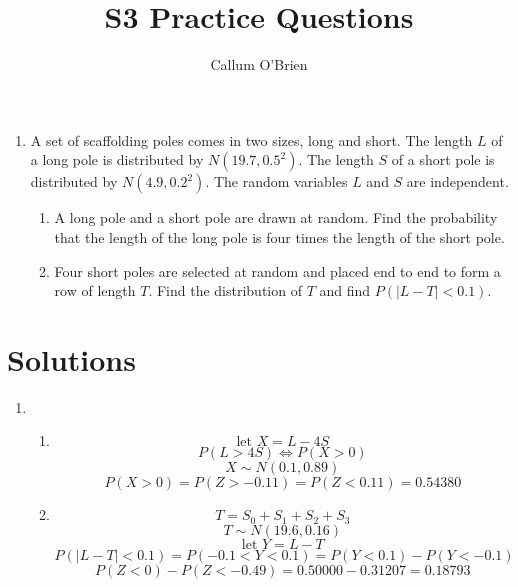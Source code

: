 \documentclass{article}
\begin{document}
\title{S3 Practice Questions}
\author{Callum O'Brien}
\maketitle

\begin{enumerate}

    \item A set of scaffolding poles comes in two sizes, long and short. The
        length $L$ of a long pole is distributed by $N \left(19.7,
        0.5^2\right)$. The length $S$ of a short pole is distributed by $N
        \left(4.9, 0.2^2\right)$. The random variables $L$ and $S$ are
        independent. \begin{enumerate}

        \item A long pole and a short pole are drawn at random. Find the
            probability that the length of the long pole is four times the
            length of the short pole.

        \item Four short poles are selected at random and placed end to end to
            form a row of length $T$. Find the distribution of $T$ and find
            $P\left(|L - T| < 0.1\right)$.

        \end{enumerate}

\end{enumerate}

\newpage
\section{Solutions}

\begin{enumerate}

    \item \begin{enumerate}

            \item
               
                \[\textrm{let } X = L - 4S\]
                \[P\left(L > 4S\right) \Leftrightarrow P\left(X > 0\right)\]
                \[X \sim N\left(0.1, 0.89\right)\]
                \[P\left(X > 0\right) = P\left(Z > - 0.11\right) = P\left(Z <
                0.11\right) = 0.54380\]

            \item

                \[T = S_0 + S_1 + S_2 + S_3\]
                \[T \sim N\left(19.6, 0.16\right)\]
                \[\textrm{let } Y = L - T\]
                \[P\left(|L-T| < 0.1\right) = P\left(-0.1 < Y < 0.1\right) =
                P\left(Y < 0.1\right) - P\left(Y < -0.1\right)\]
                \[P\left(Z < 0\right) - P\left(Z < -0.49\right) = 0.50000 -
                0.31207 = 0.18793\]

        \end{enumerate}

\end{enumerate}
\end{document}
